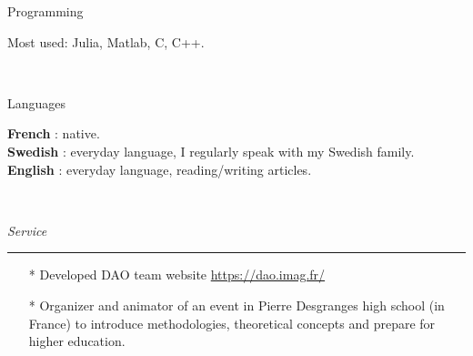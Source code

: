 \documentclass[a4paper,10pt]{article}
\begin{document}
	\noindent
	\begin{minipage}{0.20\textwidth}
		\color{MyGray} Programming
	\end{minipage}
	\hfill
	\begin{minipage}{0.70\textwidth}
		Most used: Julia, Matlab, C, C++.\\
	\end{minipage}\\
	\vspace{2mm}
	
	\noindent
	\begin{minipage}{0.20\textwidth}
		\color{MyGray} Languages
	\end{minipage}
	\hfill
	\begin{minipage}{0.70\textwidth}
		\textbf{French} : native.\\
		\textbf{Swedish} : everyday language, I regularly speak with my Swedish family.\\
		\textbf{English} : everyday language, reading/writing articles.\\
	\end{minipage}\\
	\vspace{2mm}
	
	\noindent
	\textit{\Large \color{MyGray} \hspace{5mm} Service}
	\vspace{2mm}
	{\color{DefaultGray}\hrule height .1pt}
	\vspace{5mm}
	
	\begin{itemize}
		\setlength\itemsep{3mm}
		\item[*] Developed DAO team website \url{https://dao.imag.fr/}
		\item[*] Organizer and animator of an event in Pierre Desgranges high school (in France) to introduce methodologies, theoretical concepts and prepare for higher education.
	\end{itemize}
	\vspace{5mm}
	
%	
	
\end{document}

